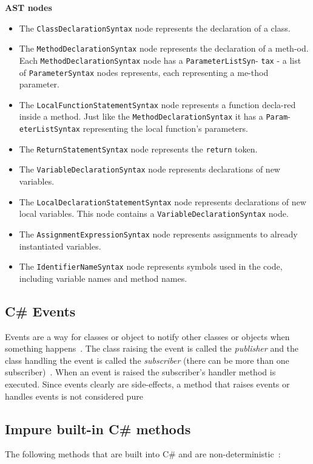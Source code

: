 \documentclass[a4paper,12pt]{article}
\begin{document}
\textbf{AST nodes}

\begin{itemize}
  \item The \texttt{ClassDeclarationSyntax} node represents the declaration of a class.
  \item The \texttt{MethodDeclarationSyntax} node represents the declaration of a meth-od. Each \texttt{MethodDeclarationSyntax} node has a \texttt{ParameterListSyn}- \texttt{tax} - a list of \texttt{ParameterSyntax} nodes represents, each representing a me-thod parameter.
  \item The \texttt{LocalFunctionStatementSyntax} node represents a function decla-red inside a method. Just like the \texttt{MethodDeclarationSyntax} it has a \texttt{Param}-\texttt{eterListSyntax} representing the local function's parameters.
  \item The \texttt{ReturnStatementSyntax} node represents the \texttt{return} token.
  \item The \texttt{VariableDeclarationSyntax} node represents declarations of new variables.
  \item The \texttt{LocalDeclarationStatementSyntax} node represents declarations of new local variables. This node contains a \texttt{VariableDeclarationSyntax} node.
  \item The \texttt{AssignmentExpressionSyntax} node represents assignments to already instantiated variables.
  \item The \texttt{IdentifierNameSyntax} node represents symbols used in the code, including variable names and method names.
\end{itemize}

\subsection{C\# Events} \label{sub:Events}
Events are a way for classes or object to notify other classes or objects when something happens~\cite{microsoft-events}. The class raising the event is called the \textit{publisher} and the class handling the event is called the \textit{subscriber} (there can be more than one subscriber)~\cite{microsoft-events}. When an event is raised the subscriber's handler method is executed. Since events clearly are side-effects, a method that raises events or handles events is not considered pure

\subsection{Impure built-in C\# methods} \label{sub:Impure-built-in-methods}
The following methods that are built into C\# and are non-deterministic~\cite{dixin2015}:
\end{document}

